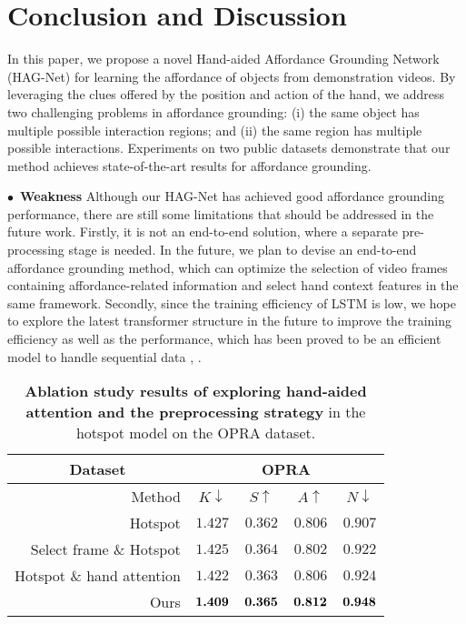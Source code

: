 \documentclass[journal,twoside]{IEEEtran}
\newcommand{\myPara}[1]{\vspace{5pt}\noindent$\bullet$~\textbf{#1} \quad}
\begin{document}
\section{Conclusion and Discussion}

In this paper, we propose a novel Hand-aided Affordance Grounding Network (HAG-Net) for learning the affordance of objects from demonstration videos. By leveraging the clues offered by the position and action of the hand, we address two challenging problems in affordance grounding: (i) the same object has multiple possible interaction regions; and (ii) the same region has multiple possible interactions. Experiments on two public datasets demonstrate that our method achieves state-of-the-art results for affordance grounding.

\myPara{Weakness}
Although our HAG-Net has achieved good affordance grounding performance, there are still some limitations that should be addressed in the future work. Firstly, it is not an end-to-end solution, where a separate pre-processing stage is needed. In the future, we plan to devise an end-to-end affordance grounding method, which can optimize the selection of video frames containing affordance-related information and select hand context features in the same framework. Secondly, since the training efficiency of LSTM is low, we hope to explore the latest transformer structure in the future to improve the training efficiency as well as the performance, which has been proved to be an efficient model to handle sequential data \cite{vaswani2017attention,khan2021transformers}, \cite{girdhar2021anticipative}. 

\begin{table}[t]
\caption{\textbf{Ablation study results of exploring hand-aided attention and the preprocessing strategy} in the hotspot \cite{interaction-hotspots} model on the OPRA \cite{demo2vec2018cvpr} dataset.}
  \begin{center}
 \small
  \renewcommand{\arraystretch}{1.}
  \renewcommand{\tabcolsep}{5.pt}
  \begin{tabular}{r|cccc}
    \hline\toprule
    \multicolumn{1}{c|}{\textbf{Dataset}} & \multicolumn{4}{c}{\textbf{OPRA} \cite{demo2vec2018cvpr}} \\
    \hline
    Method & $K \downarrow$ & $S \uparrow$ & $A \uparrow$  & $N \downarrow$ \\
    \hline
    Hotspot \cite{interaction-hotspots} & $1.427$ & $0.362$ & $0.806$  & $0.907$ \\
    Select frame \& Hotspot  \cite{interaction-hotspots}  & $1.425$ & $0.364$  & $0.802$ & $0.922$ \\
    Hotspot \cite{interaction-hotspots} \& hand attention & $1.422$ & $0.363$ &  $0.806$  & $0.924$    \\
   \hline
   \rowcolor{mygray}
   Ours & $\normalsize\textbf{1.409}$ & $\normalsize\textbf{0.365}$ & $\normalsize\textbf{0.812}$ & $\normalsize\textbf{0.948}$  \\
    \hline\bottomrule
    \end{tabular}
    \end{center}
  \label{Table:6}
  \end{table}
\end{document}
